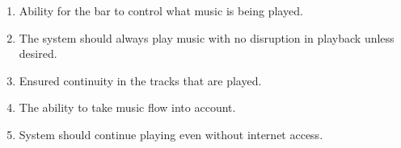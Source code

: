 \begin{enumerate}
\item Ability for the bar to control what music is being
    played.
\item The system should always play music with no disruption in playback unless desired.
\item Ensured continuity in the tracks that are played.
\item The ability to take music flow into account.
\item System should continue playing even without internet access.
\end{enumerate}

